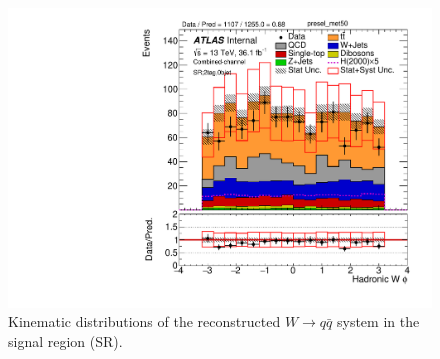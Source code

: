 \begin{figure}[!h]
\begin{center}
\includegraphics[scale=0.33]{./figures/boosted/PlotsInMbbSR/Unblinded/DataMC_2tag_0bjet_SR_lepton_presel_met50_WhadPhi}
\caption{Kinematic distributions of the reconstructed $W \to q\bar{q}$ system in the signal region (SR).}
\label{fig:boosted_SR_whad}
\end{center}
\end{figure}

